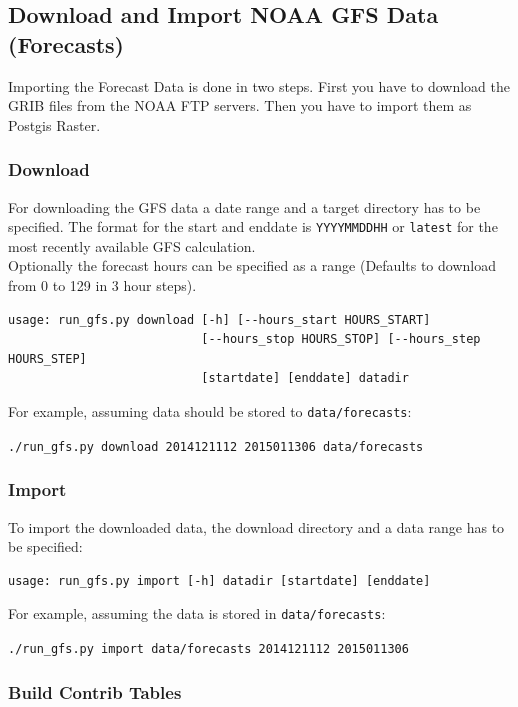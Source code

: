 \documentclass[paper=a4, fontsize=11pt]{scrartcl} %
\numberwithin{equation}{section} %
\numberwithin{figure}{section} %
\numberwithin{table}{section} %
\begin{document}
\subsection{Download and Import NOAA GFS Data
(Forecasts)}\label{download-and-import-noaa-gfs-data-forecasts}

Importing the Forecast Data is done in two steps. First you have to
download the GRIB files from the NOAA FTP servers. Then you have to
import them as Postgis Raster.

\subsubsection*{Download}\label{download}

For downloading the GFS data a date range and a target directory has to
be specified. The format for the start and enddate is
\texttt{YYYYMMDDHH} or \texttt{latest} for the most recently available
GFS calculation.\\Optionally the forecast hours can be specified as a
range (Defaults to download from 0 to 129 in 3 hour steps).

\begin{verbatim}
usage: run_gfs.py download [-h] [--hours_start HOURS_START]
                           [--hours_stop HOURS_STOP] [--hours_step HOURS_STEP]
                           [startdate] [enddate] datadir
\end{verbatim}

For example, assuming data should be stored to \texttt{data/forecasts}:

\texttt{./run\_gfs.py\ download\ 2014121112\ 2015011306\ data/forecasts}

\subsubsection*{Import}\label{import}

To import the downloaded data, the download directory and a data range
has to be specified:

\begin{verbatim}
usage: run_gfs.py import [-h] datadir [startdate] [enddate]
\end{verbatim}

For example, assuming the data is stored in \texttt{data/forecasts}:

\texttt{./run\_gfs.py\ import\ data/forecasts\ 2014121112\ 2015011306}

\subsubsection*{Build Contrib Tables}\label{build-contrib-tables}
\end{document}
